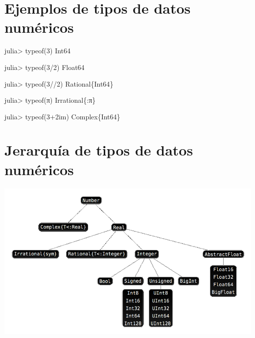 \documentclass[
  letterpaper,
  DIV=11,
  numbers=noendperiod]{scrreprt}
\newenvironment{Shaded}{\begin{snugshade}}{\end{snugshade}}
\newcommand{\ConstantTok}[1]{\textcolor[rgb]{0.56,0.35,0.01}{#1}}
\newcommand{\DataTypeTok}[1]{\textcolor[rgb]{0.68,0.00,0.00}{#1}}
\newcommand{\FloatTok}[1]{\textcolor[rgb]{0.68,0.00,0.00}{#1}}
\newcommand{\FunctionTok}[1]{\textcolor[rgb]{0.28,0.35,0.67}{#1}}
\newcommand{\NormalTok}[1]{\textcolor[rgb]{0.00,0.23,0.31}{#1}}
\newcommand{\OperatorTok}[1]{\textcolor[rgb]{0.37,0.37,0.37}{#1}}
\begin{document}
\hypertarget{ejemplos-de-tipos-de-datos-numuxe9ricos}{%
\section{Ejemplos de tipos de datos
numéricos}\label{ejemplos-de-tipos-de-datos-numuxe9ricos}}

\begin{Shaded}
\begin{Highlighting}[]
\NormalTok{julia}\OperatorTok{\textgreater{}} \FunctionTok{typeof}\NormalTok{(}\FloatTok{3}\NormalTok{)}
\DataTypeTok{Int64}

\NormalTok{julia}\OperatorTok{\textgreater{}} \FunctionTok{typeof}\NormalTok{(}\FloatTok{3}\OperatorTok{/}\FloatTok{2}\NormalTok{)}
\DataTypeTok{Float64}

\NormalTok{julia}\OperatorTok{\textgreater{}} \FunctionTok{typeof}\NormalTok{(}\FloatTok{3}\OperatorTok{//}\FloatTok{2}\NormalTok{)}
\DataTypeTok{Rational}\NormalTok{\{}\DataTypeTok{Int64}\NormalTok{\}}

\NormalTok{julia}\OperatorTok{\textgreater{}} \FunctionTok{typeof}\NormalTok{(}\ConstantTok{π}\NormalTok{)}
\DataTypeTok{Irrational}\NormalTok{\{}\OperatorTok{:}\ConstantTok{π}\NormalTok{\}}

\NormalTok{julia}\OperatorTok{\textgreater{}} \FunctionTok{typeof}\NormalTok{(}\FloatTok{3}\OperatorTok{+}\FloatTok{2im}\NormalTok{)}
\DataTypeTok{Complex}\NormalTok{\{}\DataTypeTok{Int64}\NormalTok{\}}
\end{Highlighting}
\end{Shaded}

\hypertarget{jerarquuxeda-de-tipos-de-datos-numuxe9ricos}{%
\section{Jerarquía de tipos de datos
numéricos}\label{jerarquuxeda-de-tipos-de-datos-numuxe9ricos}}

\includegraphics{./img/tipos-datos-numericos.png}
\end{document}
